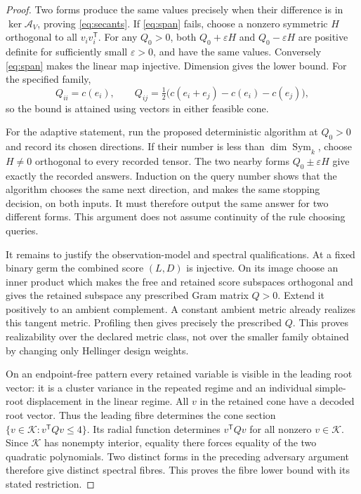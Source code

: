 \documentclass[11pt,reqno]{amsart}
\numberwithin{equation}{section}
\theoremstyle{definition}
\theoremstyle{remark}
\newcommand{\Sym}{\operatorname{Sym}}
\newcommand{\cK}{\mathcal K}
\begin{document}
\begin{proof}
Two forms produce the same values precisely when their difference is in $\ker\mathcal A_V$, proving \eqref{eq:secants}. If \eqref{eq:span} fails, choose a nonzero symmetric $H$ orthogonal to all $v_iv_i^{\mathsf T}$. For any $Q_0>0$, both $Q_0+\varepsilon H$ and $Q_0-\varepsilon H$ are positive definite for sufficiently small $\varepsilon>0$, and have the same values. Conversely \eqref{eq:span} makes the linear map injective. Dimension gives the lower bound. For the specified family,
\[
 Q_{ii}=c(e_i),\qquad Q_{ij}=\tfrac12\bigl(c(e_i+e_j)-c(e_i)-c(e_j)\bigr),
\]
so the bound is attained using vectors in either feasible cone.

For the adaptive statement, run the proposed deterministic algorithm at $Q_0>0$ and record its chosen directions. If their number is less than $\dim\Sym_k$, choose $H\ne0$ orthogonal to every recorded tensor. The two nearby forms $Q_0\pm\varepsilon H$ give exactly the recorded answers. Induction on the query number shows that the algorithm chooses the same next direction, and makes the same stopping decision, on both inputs. It must therefore output the same answer for two different forms. This argument does not assume continuity of the rule choosing queries.

It remains to justify the observation-model and spectral qualifications. At a fixed binary germ the combined score $(L,D)$ is injective. On its image choose an inner product which makes the free and retained score subspaces orthogonal and gives the retained subspace any prescribed Gram matrix $Q>0$. Extend it positively to an ambient complement. A constant ambient metric already realizes this tangent metric. Profiling then gives precisely the prescribed $Q$. This proves realizability over the declared metric class, not over the smaller family obtained by changing only Hellinger design weights.

On an endpoint-free pattern every retained variable is visible in the leading root vector: it is a cluster variance in the repeated regime and an individual simple-root displacement in the linear regime. All $v$ in the retained cone have a decoded root vector. Thus the leading fibre determines the cone section $\{v\in\cK:v^{\mathsf T}Qv\le4\}$. Its radial function determines $v^{\mathsf T}Qv$ for all nonzero $v\in\cK$. Since $\cK$ has nonempty interior, equality there forces equality of the two quadratic polynomials. Two distinct forms in the preceding adversary argument therefore give distinct spectral fibres. This proves the fibre lower bound with its stated restriction.
\end{proof}
\end{document}
